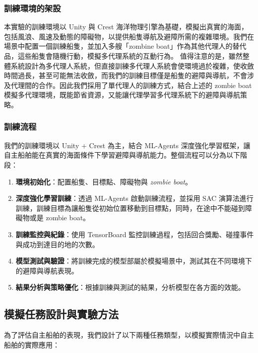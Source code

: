\documentclass[12pt,a4paper]{ctexart}
\begin{document}
\subsubsection{訓練環境的架設}
本實驗的訓練環境以 Unity 與 Crest 海洋物理引擎為基礎，模擬出真實的海面，包括風浪、風速及動態的障礙物，以提供船隻導航及避障所需的複雜環境。我們在場景中配置一個訓練船隻，並加入多艘「zombine boat」作為其他代理人的替代品，這些船隻會隨機行動，模擬多代理系統的互動行為。
值得注意的是，雖然整體系統設計為多代理人系統，但直接訓練多代理人系統會使環境過於複雜，使收斂時間過長，甚至可能無法收斂，而我們的訓練目標僅是船隻的避障與導航，不會涉及代理間的合作。因此我們採用了單代理人的訓練方式，結合上述的 zombie boat 模擬多代理環境，既能節省資源，又能讓代理學習多代理系統下的避障與導航策略。

\subsubsection{訓練流程}
我們的訓練環境以 Unity + Crest 為主，結合 ML-Agents 深度強化學習框架，讓自主船舶能在真實的海面條件下學習避障與導航能力。整個流程可以分為以下階段：
\begin{enumerate}
    \item \textbf{環境初始化}：配置船隻、目標點、障礙物與 \textit{zombie boat}。
    \item \textbf{深度強化學習訓練}：透過 ML-Agents 啟動訓練流程，並採用 SAC 演算法進行訓練，訓練目標為讓船隻從初始位置移動到目標點，同時，在途中不能碰到障礙物或是 zombie boat。
    \item \textbf{訓練監控與紀錄}：使用 TensorBoard 監控訓練過程，包括回合獎勵、碰撞事件與成功到達目的地的次數。
    \item \textbf{模型測試與驗證}：將訓練完成的模型部屬於模擬場景中，測試其在不同環境下的避障與導航表現。
    \item \textbf{結果分析與策略優化}：根據訓練與測試的結果，分析模型在各方面的效能。
\end{enumerate}

\subsection{模擬任務設計與實驗方法}
為了評估自主船舶的表現，我們設計了以下兩種任務類型，以模擬實際情況中自主船舶的實際應用：
\end{document}
